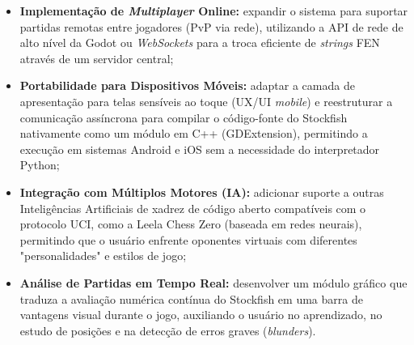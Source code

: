 \begin{itemize}
	\item \textbf{Implementação de \textit{Multiplayer} Online:} expandir o sistema para suportar partidas remotas entre jogadores (PvP via rede), utilizando a API de rede de alto nível da Godot ou \textit{WebSockets} para a troca eficiente de \textit{strings} FEN através de um servidor central;
	\item \textbf{Portabilidade para Dispositivos Móveis:} adaptar a camada de apresentação para telas sensíveis ao toque (UX/UI \textit{mobile}) e reestruturar a comunicação assíncrona para compilar o código-fonte do Stockfish nativamente como um módulo em C++ (GDExtension), permitindo a execução em sistemas Android e iOS sem a necessidade do interpretador Python;
	\item \textbf{Integração com Múltiplos Motores (IA):} adicionar suporte a outras Inteligências Artificiais de xadrez de código aberto compatíveis com o protocolo UCI, como a Leela Chess Zero (baseada em redes neurais), permitindo que o usuário enfrente oponentes virtuais com diferentes "personalidades" e estilos de jogo;
	\item \textbf{Análise de Partidas em Tempo Real:} desenvolver um módulo gráfico que traduza a avaliação numérica contínua do Stockfish em uma barra de vantagens visual durante o jogo, auxiliando o usuário no aprendizado, no estudo de posições e na detecção de erros graves (\textit{blunders}).
\end{itemize}